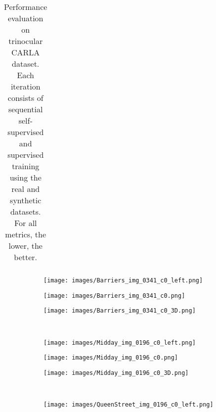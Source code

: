 \documentclass[10pt,twocolumn,letterpaper]{article}
\begin{document}
\begin{table}[tbp]
\begin{center}
\begin{tabular}{@{\hskip1pt}c@{\hskip1pt}|@{\hskip1pt}c@{\hskip1pt}|@{\hskip1pt}c@{\hskip1pt}|@{\hskip1pt}c@{\hskip1pt}|@{\hskip1pt}c@{\hskip1pt}|@{\hskip1pt}c@{\hskip1pt}}
		\end{tabular}
	\end{center}
	\vspace{-0.3cm}
	\caption{Performance evaluation on trinocular CARLA dataset. Each iteration consists of sequential self-supervised and supervised training using the real and synthetic datasets. For all metrics, the lower, the better.}
	\label{tab:ietration}
\end{table}
 \begin{figure}[tbp]
	\captionsetup[subfigure]{labelformat=empty}
	\centering
	\begin{subfigure}[c]{.325\linewidth}
		\texttt{[image: images/Barriers\_img\_0341\_c0\_left.png]}
		\vspace*{-0.38cm}
	\end{subfigure}
	\begin{subfigure}[c]{.325\linewidth}
		\texttt{[image: images/Barriers\_img\_0341\_c0.png]}
		\vspace*{-0.38cm}
	\end{subfigure}
	\begin{subfigure}[c]{.325\linewidth}
		\texttt{[image: images/Barriers\_img\_0341\_c0\_3D.png]}
		\vspace*{-0.38cm}
	\end{subfigure}
	\\\begin{subfigure}[c]{.325\linewidth}
		\texttt{[image: images/Midday\_img\_0196\_c0\_left.png]}
		\vspace*{-0.38cm}
	\end{subfigure}
	\begin{subfigure}[c]{.325\linewidth}
		\texttt{[image: images/Midday\_img\_0196\_c0.png]}
		\vspace*{-0.38cm}
	\end{subfigure}
	\begin{subfigure}[c]{.325\linewidth}
		\texttt{[image: images/Midday\_img\_0196\_c0\_3D.png]}
		\vspace*{-0.38cm}
	\end{subfigure}
	\\\begin{subfigure}[c]{.325\linewidth}
		\texttt{[image: images/QueenStreet\_img\_0196\_c0\_left.png]}
		\vspace*{-0.45cm}
	\end{subfigure}
	\begin{subfigure}[c]{.325\linewidth}

\end{subfigure}
\end{figure}
\end{document}
